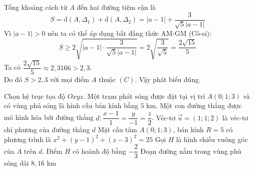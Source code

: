 \begin{ex}
{\begin{itemchoice}
			Tổng khoảng cách từ $A$ đến hai đường tiệm cận là
			$$S = \mathrm{d}(A, \Delta_1) + \mathrm{d}(A, \Delta_2) = |a - 1|
			+ \dfrac{3}{\sqrt{5}|a - 1|}$$
			Vì $|a - 1| > 0$ nên ta có thể áp dụng bất đẳng thức AM-GM (Cô-si):\\
			$$S \ge 2\sqrt{|a - 1| \cdot \dfrac{3}{\sqrt{5}|a - 1|}} = 2\sqrt{\dfrac{3}{\sqrt{5}}} = \dfrac{2\sqrt{15}}{5}$$
			Ta có $\dfrac{2\sqrt{15}}{5} \approx 2{,}3166 > 2{,}3$.\\
			Do đó $S > 2{,}3$ với mọi điểm $A$ thuộc $(C)$.
			Vậy phát biểu đúng.
		\end{itemchoice}
	}
\end{ex}

\begin{ex}%
	Chọn hệ trục tọa độ $Oxyz$.
	Một trạm phát sóng được đặt tại vị trí $A(0; 1; 3)$ và có vùng phủ sóng là hình cầu bán kính bằng $5$ km.
	Một con đường thẳng được mô hình hóa bởi đường thẳng $d \colon \dfrac{x-1}{1} = \dfrac{y}{-1} = \dfrac{z}{2}$.
	\choiceTF
	{Véc-tơ $\overrightarrow{u} = (1; 1; 2)$ là véc-tơ chỉ phương của đường thẳng $d$}
	{\True Mặt cầu tâm $A(0; 1; 3)$, bán kính $R = 5$ có phương trình là $x^2 + (y-1)^2 + (z-3)^2 = 25$}
	{Gọi $H$ là hình chiếu vuông góc của $A$ trên $d$.
		Điểm $H$ có hoành độ bằng $-\dfrac{2}{3}$}
	{\True Đoạn đường nằm trong vùng phủ sóng dài $8{,}16$ km}
\end{ex}
